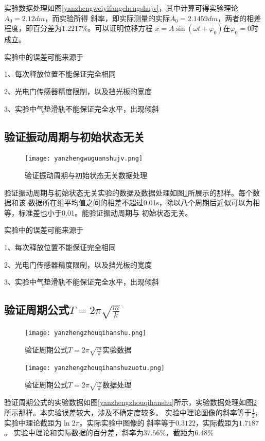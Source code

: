 \documentclass{ctexart}
\begin{document}
  实验数据处理如图\ref{yanzhengweiyifangchengshujv}，其中计算可得实验理论$A_{0}=2.12dm$，而实验所得
  斜率，即实际测量的实际$A_{0}=2.1459dm$，两者的相差程度，即百分差为$1.2217\%$。可以证明位移方程
  $x=A\sin \left( \omega t + {\varphi}_{0} \right) \mbox{在}{\varphi}_{0} = 0 $时成立。

  实验中的误差可能来源于

  1、每次释放位置不能保证完全相同

  2、光电门传感器精度限制，以及挡光板的宽度

  3、实验中气垫滑轨不能保证完全水平，出现倾斜

  \subsection{验证振动周期与初始状态无关}
  \begin{figure}[t]
    \centering
    \texttt{[image: yanzhengwuguanshujv.png]}
    \caption{验证振动周期与初始状态无关数据处理}\label{yanzhengwuguanshujv}
  \end{figure}
  验证振动周期与初始状态无关实验的数据及数据处理如图\ref{yanzhengwuguanshujv}所展示的那样。每个数据和该
  数据所在组平均值之间的相差不超过0.01s，除以八个周期后近似可以为相等，标准差也小于0.01。能验证振动周期与
  初始状态无关。

  实验中的误差可能来源于
  
  1、每次释放位置不能保证完全相同

  2、光电门传感器精度限制，以及挡光板的宽度

  3、实验中气垫滑轨不能保证完全水平，出现倾斜

  \subsection{验证周期公式$T=2\pi \sqrt{\frac{m}{k}}$}
  \begin{figure}[b]
    \centering
    \begin{minipage}[b]{0.48\textwidth}
      \centering
      \texttt{[image: yanzhengzhouqihanshu.png]}
      \caption{验证周期公式$T=2\pi \sqrt{\frac{m}{k}}$实验数据}\label{yanzhengzhouqihanshu}
    \end{minipage}
    \begin{minipage}[b]{0.48\textwidth}
      \centering
      \texttt{[image: yanzhengzhouqihanshuzuotu.png]}
      \caption{验证周期公式$T=2\pi \sqrt{\frac{m}{k}}$数据处理}\label{yanzhengzhouqigongshizuotu}
    \end{minipage}
  \end{figure}
  验证周期公式的实验数据如图\ref{yanzhengzhouqihanshu}所示，实验数据处理如图\ref{yanzhengzhouqigongshizuotu}
  所示那样。本实验误差较大，涉及不确定度较多。
  实验中理论图像的斜率等于$\frac{1}{2}$，实验中理论截距为$\ln{2\pi}$。实际实验中图像的
  斜率等于$0.3122$，实际截距为$1.7187$。
  实验中理论和实际数据的百分差，斜率为$37.56\%$，截距为$6.48\%$
\end{document}
